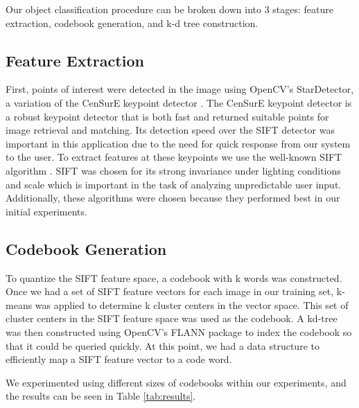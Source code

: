 Our object classification procedure can be broken down into 3 stages: feature
extraction, codebook generation, and k-d tree construction.

\subsection{Feature Extraction}
First, points of interest were detected in the image using OpenCV's StarDetector,
a variation of the CenSurE keypoint detector \cite{agrawal2008censure}. 
The CenSurE keypoint detector is a robust keypoint detector that is both fast and returned suitable points for image retrieval and matching.
Its detection speed over the SIFT detector was important in this application due to the need for quick response from our system to the user.
To extract features at these keypoints we use the well-known SIFT algorithm \cite{lowe1999object}. 
SIFT was chosen for its strong invariance under lighting conditions and scale which is important in the task of analyzing unpredictable user input. 
Additionally, these algorithms were chosen because they performed best in our initial experiments.

\subsection{Codebook Generation}
To quantize the SIFT feature space, a codebook with k words was constructed.
Once we had a set of SIFT feature vectors for each image in our training set, k-means was applied to determine k cluster centers in the vector space. 
This set of cluster centers in the SIFT feature space was used as the codebook. 
A kd-tree was then constructed using OpenCV's FLANN \cite{muja2009fast} package to index the codebook so that it could be queried quickly. 
At this point, we had a data structure to efficiently map a SIFT feature vector to a code word.

We experimented using different sizes of codebooks within our experiments, and the results can be seen in Table \ref{tab:results}.

